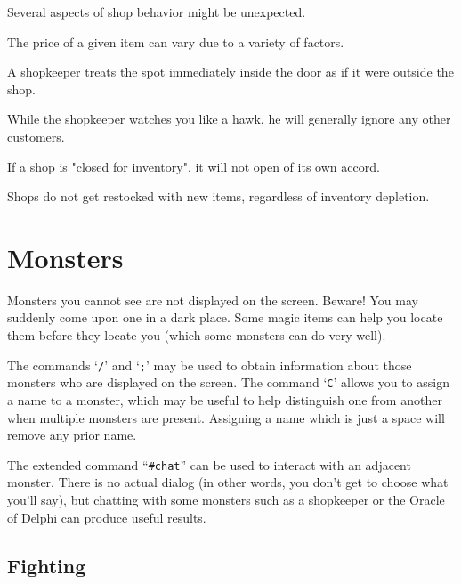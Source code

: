 
Several aspects of shop behavior might be unexpected.
\blist{}

\item[\tb{* 2}]
The price of a given item can vary due to a variety of factors.

\item[\tb{* 2}]
A shopkeeper treats the spot immediately inside the door as if it were
outside the shop.

\item[\tb{* 2}]
While the shopkeeper watches you like a hawk, he will generally ignore
any other customers.

\item[\tb{* 2}]
If a shop is "closed for inventory", it will not open of its own accord.

\item[\tb{* 2}]
Shops do not get restocked with new items, regardless of inventory depletion.

\elist
\nd %
\section{Monsters}


Monsters you cannot see are not displayed on the screen.  Beware!
You may suddenly come upon one in a dark place.  Some magic items can
help you locate them before they locate you (which some monsters can do
very well).

The commands `{\tt /}' and `{\tt ;}' may be used to obtain information about those
monsters who are displayed on the screen.  The command `{\tt C}' allows you
to assign a name to a monster, which may be useful to help distinguish
one from another when multiple monsters are present.  Assigning a name
which is just a space will remove any prior name.

The extended command ``{\tt \#chat}'' can be used to interact with an adjacent
monster.  There is no actual dialog (in other words, you don't get to
choose what you'll say), but chatting with some monsters such as a
shopkeeper or the Oracle of Delphi can produce useful results.
\subsection*{Fighting}


